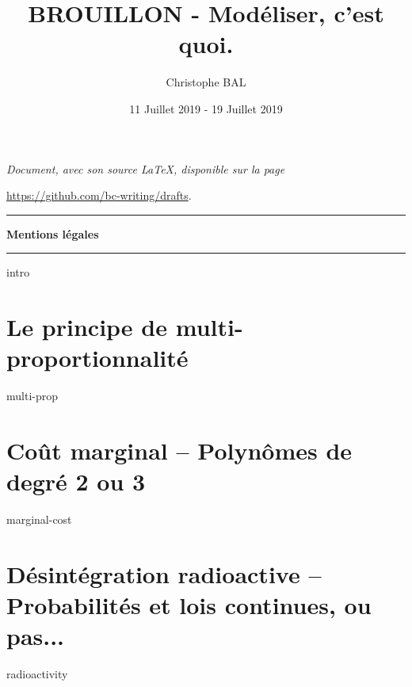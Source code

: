 \documentclass[12pt]{amsart}
\let\oldsection\section
\renewcommand\section[1]{\vfill\pagebreak\oldsection{#1}}
\begin{document}
\title{BROUILLON - Modéliser, c'est quoi.}
\author{Christophe BAL}
\date{11 Juillet 2019 - 19 Juillet 2019}


\maketitle

\begin{center}
	\itshape
	Document, avec son source \LaTeX, disponible sur la page
	
	\url{https://github.com/bc-writing/drafts}.
\end{center}


\bigskip


\begin{center}
	\hrule\vspace{.3em}
	{
		\fontsize{1.35em}{1em}\selectfont
		\textbf{Mentions \og légales \fg}
	}
			
	\vspace{0.45em}
	\doclicenseThis
	\hrule
\end{center}



\setcounter{tocdepth}{1}
\tableofcontents




{intro}




\section{Le principe de \og multi-proportionnalité \fg}

{multi-prop}




\section{Coût marginal -- Polynômes de degré 2 ou 3}

{marginal-cost}




\section{Désintégration radioactive -- Probabilités et lois continues, ou pas...}

{radioactivity}
\end{document}
